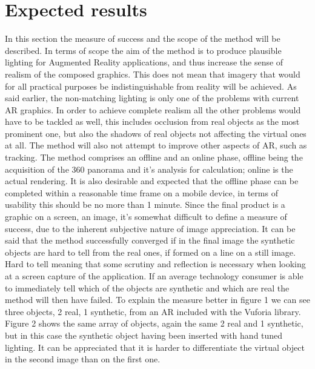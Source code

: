 \documentclass{article}
\begin{document}
\section{Expected results}
In this section the measure of success and the scope of the method will be described. In terms of scope the aim of the method is to produce plausible lighting for Augmented Reality applications, and thus increase the sense of realism of the composed graphics. This does not mean that imagery that would for all practical purposes be indistinguishable from reality will be achieved. As said earlier, the non-matching lighting is only one of the problems with current AR graphics. In order to achieve complete realism all the other problems would have to be tackled as well, this includes occlusion from real objects as the most prominent one, but also the shadows of real objects not affecting the virtual ones at all. The method will also not attempt to improve other aspects of AR, such as tracking. The method comprises an offline and an online phase, offline being the acquisition of the 360 panorama and it's analysis for calculation; online is the actual rendering. It is also desirable and expected that the offline phase can be completed within a reasonable time frame on a mobile device, in terms of usability this should be no more than 1 minute.\newline
Since the final product is a graphic on a screen, an image, it's somewhat difficult to define a measure of success, due to the inherent subjective nature of image appreciation. It can be said that the method successfully converged if in the final image the synthetic objects are hard to tell from the real ones, if formed on a line on a still image. Hard to tell meaning that some scrutiny and reflection is necessary when looking at a screen capture of the application. If an average technology consumer is able to immediately tell which of the objects are synthetic and which are real the method will then have failed. To explain the measure better in figure 1 we can see three objects, 2 real, 1 synthetic, from an AR included with the Vuforia library. Figure 2 shows the same array of objects, again the same 2 real and 1 synthetic, but in this case the synthetic object having been inserted with hand tuned lighting. It can be appreciated that it is harder to differentiate the virtual object in the second image than on the first one.
\end{document}
